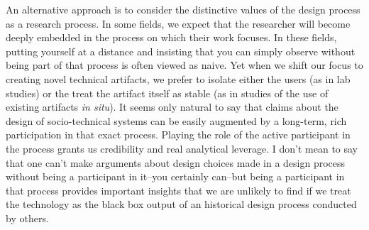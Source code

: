 
An alternative approach is to consider the distinctive values of the design process as a research process. In some fields, we expect that the researcher will become deeply embedded in the process on which their work focuses. In these fields, putting yourself at a distance and insisting that you can simply observe without being part of that process is often viewed as naive. Yet when we shift our focus to creating novel technical artifacts, we prefer to isolate either the users (as in lab studies) or the treat the artifact itself as stable (as in studies of the use of existing artifacts \emph{in situ}). It seems only natural to say that claims about the design of socio-technical systems can be easily augmented by a long-term, rich participation in that exact process. Playing the role of the active participant in the process grants us credibility and real analytical leverage. I don't mean to say that one can't make arguments about design choices made in a design process without being a participant in it--you certainly can--but being a participant in that process provides important insights that we are unlikely to find if we treat the technology as the black box output of an historical design process conducted by others. 



